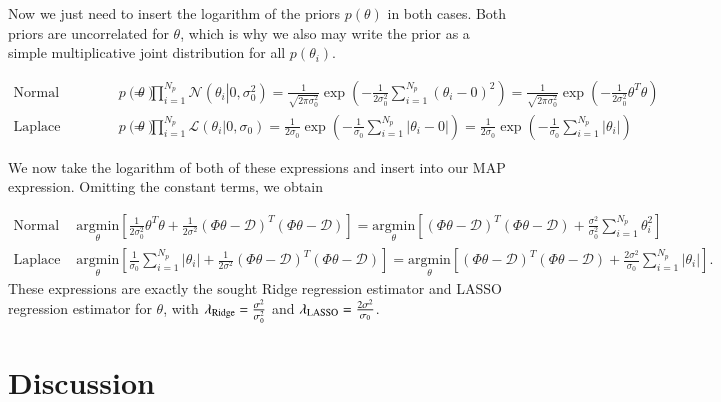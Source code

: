 \documentclass[11pt,a4paper]{article}
\begin{document}
Now we just need to insert the logarithm of the priors $p(\theta)$ in both cases. Both priors are uncorrelated for $\theta$, which is why we also may write the prior as a simple multiplicative joint distribution for all $p(\theta_i)$.

\begin{align*}
    \text{Normal parameter prior: } p(\theta) &= \prod_{i=1}^{N_p} \mathcal{N}(\theta_i \left\vert\right. 0, \sigma_0^2) = \frac{1}{\sqrt{2\pi\sigma_0^2}} \exp\left({{- \frac{1}{2\sigma_0^2}\sum_{i=1}^{N_p} \left(\theta_i - 0\right)^2}}\right) = \frac{1}{\sqrt{2\pi\sigma_0^2}} \exp\left( -\frac{1}{2\sigma_0^2} \theta^T\theta \right) \\
    \text{Laplace parameter prior: } p(\theta) &= \prod_{i=1}^{N_p} \mathcal{L}(\theta_i \left\vert\right. 0, \sigma_0) = \frac{1}{2\sigma_0} \exp\left(- \frac{1}{\sigma_0}\sum_{i=1}^{N_p} \left\vert\theta_i - 0\right\vert \right) = \frac{1}{2\sigma_0} \exp\left(- \frac{1}{\sigma_0}\sum_{i=1}^{N_p} \left\vert\theta_i\right\vert \right)
\end{align*}

We now take the logarithm of both of these expressions and insert into our MAP expression. Omitting the constant terms, we obtain

\begin{align*}
    \text{Normal prior: } &\underset{\theta}{\mathrm{argmin}} \left[ \frac{1}{2\sigma_0^2}\theta^T\theta  + \frac{1}{2\sigma^2} \left(\Phi \theta -  \mathcal{D} \right)^T\left(\Phi \theta -  \mathcal{D} \right) \right] = \underset{\theta}{\mathrm{argmin}} \left[ \left(\Phi \theta -  \mathcal{D} \right)^T\left(\Phi \theta -  \mathcal{D} \right) + \frac{\sigma^2}{\sigma_0^2}\sum_{i=1}^{N_p} \theta_i^2  \right]  \\
    \text{Laplace prior: } &\underset{\theta}{\mathrm{argmin}} \left[ \frac{1}{\sigma_0}\sum_{i=1}^{N_p} \left\vert\theta_i\right\vert + \frac{1}{2\sigma^2} \left(\Phi \theta -  \mathcal{D} \right)^T\left(\Phi \theta -  \mathcal{D} \right) \right] = \underset{\theta}{\mathrm{argmin}} \left[ \left(\Phi \theta -  \mathcal{D} \right)^T\left(\Phi \theta -  \mathcal{D} \right) + \frac{2\sigma^2}{\sigma_0}\sum_{i=1}^{N_p} \left\vert\theta_i\right\vert  \right].
\end{align*}
These expressions are exactly the sought Ridge regression estimator and LASSO regression estimator for $\theta$, with $\lambda_{\rm Ridge} = \frac{\sigma^2}{\sigma_0^2}$ and $\lambda_{\rm LASSO} = \frac{2\sigma^2}{\sigma_0}$.



\section{Discussion}
\end{document}

